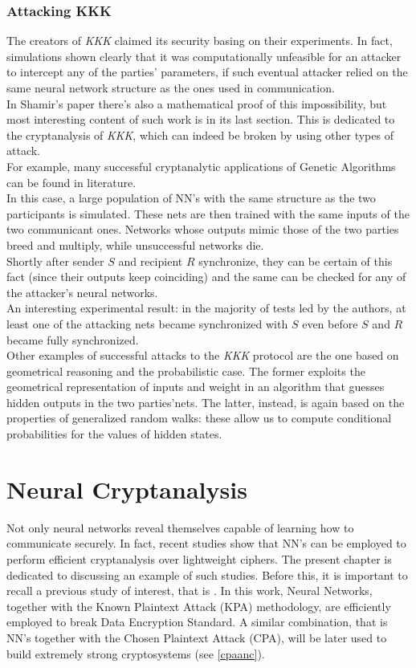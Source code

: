 \documentclass[%
    corpo=11pt,
    twoside,
    stile=classica,
    oldstyle,
    autoretitolo,
    tipotesi=magistrale,
    greek,
    evenboxes,
    english
]{toptesi}
\begin{document}
\subsection{Attacking KKK}
\label{ssc:atk}
The creators of \textit{KKK} claimed its security basing on their experiments. In fact, simulations shown clearly that it was computationally unfeasible for an attacker to intercept any of the parties' parameters, if such eventual attacker relied on the same neural network structure as the ones used in communication. \\
In Shamir's paper there's also a mathematical proof of this impossibility, but most interesting content of such work is in its last section. This is dedicated to the cryptanalysis of \textit{KKK}, which can indeed be broken by using other types of attack. \\
For example, many successful cryptanalytic applications of Genetic Algorithms can be found in literature. \\
In this case, a large population of NN's with the same structure as the two participants is simulated. These nets are then trained with the same inputs of the two communicant ones. Networks whose outputs mimic those of the two parties breed and multiply, while unsuccessful networks die. \\
Shortly after sender $S$ and recipient $R$ synchronize, they can be certain of this fact (since their outputs keep coinciding) and the same can be checked for any of the attacker's neural networks. \\
An interesting experimental result: in the majority of tests led by the authors, at least one  of the attacking nets became synchronized with $S$ even before $S$ and $R$ became fully synchronized. \\
Other examples of successful attacks to the \textit{KKK} protocol are the one based on geometrical reasoning and the probabilistic case. The former exploits the geometrical representation of inputs and weight in an algorithm that guesses hidden outputs in the two parties'nets. The latter, instead, is again based on the properties of generalized random walks: these allow us to compute conditional probabilities for the values of hidden states.

\chapter{Neural Cryptanalysis}
Not only neural networks reveal themselves capable of learning how to communicate securely. In fact, recent studies show that NN's can be employed to perform efficient cryptanalysis over lightweight ciphers. The present chapter is dedicated to discussing an example of such studies. Before this, it is important to recall a previous study of interest, that is \cite{alani}. In this work, Neural Networks, together with the Known Plaintext Attack (KPA) methodology, are efficiently employed to break Data Encryption Standard. A similar combination, that is NN's together with the Chosen Plaintext Attack (CPA), will be later used to build extremely strong cryptosystems (see \ref{cpaanc}). \\
\end{document}

